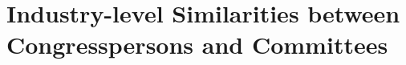\documentclass[15pt,letterpaper]{article}
\begin{document}


\section{Industry-level Similarities between Congresspersons and Committees
\protect\footnotemark
}\label{sec:ce}
\end{document}
